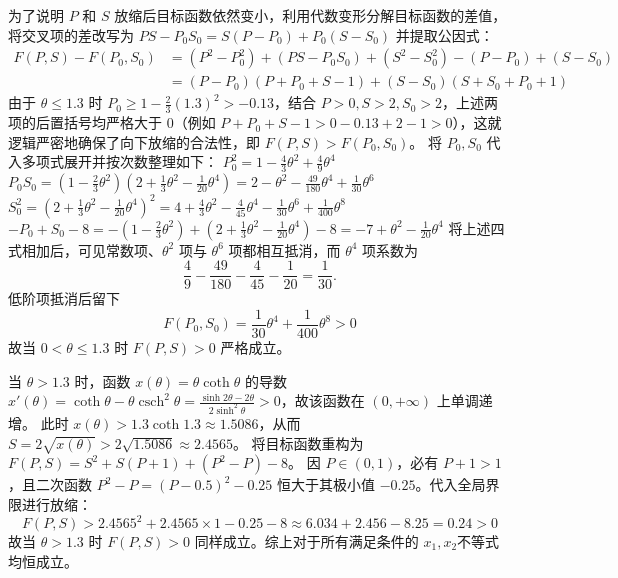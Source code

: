 \begin{solution}
为了说明 $P$ 和 $S$ 放缩后目标函数依然变小，利用代数变形分解目标函数的差值，将交叉项的差改写为 $PS - P_0 S_0 = S(P - P_0) + P_0(S - S_0)$ 并提取公因式：
\begin{align*}
F(P, S) - F(P_0, S_0) &= (P^2 - P_0^2) + (PS - P_0 S_0) + (S^2 - S_0^2) - (P - P_0) + (S - S_0) \\
&= (P - P_0)(P + P_0 + S - 1) + (S - S_0)(S + S_0 + P_0 + 1)
\end{align*}
由于 $\theta \le 1.3$ 时 $P_0 \ge 1 - \frac{2}{3}(1.3)^2 > -0.13$，结合 $P>0, S>2, S_0>2$，上述两项的后置括号均严格大于 $0$（例如 $P+P_0+S-1 > 0 - 0.13 + 2 - 1 > 0$），这就逻辑严密地确保了向下放缩的合法性，即 $F(P, S) > F(P_0, S_0)$。
将 $P_0, S_0$ 代入多项式展开并按次数整理如下：
$P_0^2 = 1 - \frac{4}{3}\theta^2 + \frac{4}{9}\theta^4$
$P_0 S_0 = \left(1 - \frac{2}{3}\theta^2\right)\left(2 + \frac{1}{3}\theta^2 - \frac{1}{20}\theta^4\right) = 2 - \theta^2 - \frac{49}{180}\theta^4 + \frac{1}{30}\theta^6$
$S_0^2 = \left(2 + \frac{1}{3}\theta^2 - \frac{1}{20}\theta^4\right)^2 = 4 + \frac{4}{3}\theta^2 - \frac{4}{45}\theta^4 - \frac{1}{30}\theta^6 + \frac{1}{400}\theta^8$
$-P_0 + S_0 - 8 = -\left(1 - \frac{2}{3}\theta^2\right) + \left(2 + \frac{1}{3}\theta^2 - \frac{1}{20}\theta^4\right) - 8 = -7 + \theta^2 - \frac{1}{20}\theta^4$
将上述四式相加后，可见常数项、\(\theta^2\) 项与 \(\theta^6\) 项都相互抵消，而 \(\theta^4\) 项系数为
\[
\frac{4}{9} - \frac{49}{180} - \frac{4}{45} - \frac{1}{20} = \frac{1}{30}.
\]
低阶项抵消后留下
\[ F(P_0, S_0) = \frac{1}{30}\theta^4 + \frac{1}{400}\theta^8 > 0 \]
故当 $0 < \theta \le 1.3$ 时 $F(P, S) > 0$ 严格成立。

当 $\theta > 1.3$ 时，函数 $x(\theta) = \theta \coth \theta$ 的导数 $x'(\theta) = \coth \theta - \theta \operatorname{csch}^2 \theta = \frac{\sinh 2\theta - 2\theta}{2\sinh^2\theta} > 0$，故该函数在 $(0, +\infty)$ 上单调递增。
此时 $x(\theta) > 1.3 \coth 1.3 \approx 1.5086$，从而 $S = 2\sqrt{x(\theta)} > 2\sqrt{1.5086} \approx 2.4565$。
将目标函数重构为 $F(P, S) = S^2 + S(P+1) + (P^2 - P) - 8$。
因 $P \in (0, 1)$，必有 $P+1 > 1$，且二次函数 $P^2 - P = (P-0.5)^2 - 0.25$ 恒大于其极小值 $-0.25$。代入全局界限进行放缩：
\[ F(P, S) > 2.4565^2 + 2.4565 \times 1 - 0.25 - 8 \approx 6.034 + 2.456 - 8.25 = 0.24 > 0 \]
故当 $\theta > 1.3$ 时 $F(P, S) > 0$ 同样成立。综上对于所有满足条件的 $x_1, x_2$不等式均恒成立。

\end{solution}

